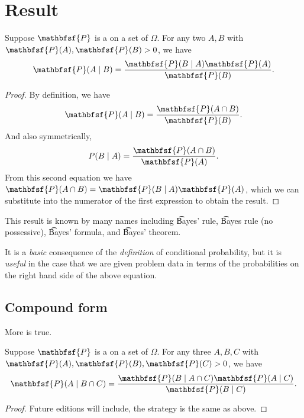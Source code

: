 
\section*{Result}

\begin{proposition}
Suppose $\mathbfsf{P} $ is a on a set of $\Omega $.
For any two $A, B$ with $\mathbfsf{P} (A), \mathbfsf{P} (B) > 0$, we have
\[
\mathbfsf{P} (A \mid  B) = \frac{ \mathbfsf{P} (B \mid A)\mathbfsf{P} (A) }{ \mathbfsf{P} (B) }.
\]
\begin{proof}By definition, we have
\[
\mathbfsf{P} (A \mid  B) = \frac{ \mathbfsf{P} (A \cap  B) }{ \mathbfsf{P} (B) }.
\]
And also symmetrically,
\[
P(B \mid  A) = \frac{ \mathbfsf{P} (A \cap  B) }{ \mathbfsf{P} (A) }.
\]
From this second equation we have $\mathbfsf{P} (A \cap  B) = \mathbfsf{P} (B \mid  A) \mathbfsf{P} (A)$, which we can substitute into the numerator of the first expression to obtain the result.\end{proof}
\end{proposition}

This result is known by many names including \t{Bayes' rule}, \t{Bayes rule} (no possessive), \t{Bayes' formula}, and \t{Bayes' theorem}.

It is a \textit{basic} consequence of the \textit{definition} of conditional probability, but it is \textit{useful} in the case that we are given problem data in terms of the probabilities on the right hand side of the above equation.

\subsection*{Compound form}

More is true.

\begin{proposition}
Suppose $\mathbfsf{P} $ is a on a set of $\Omega $.
For any three $A, B, C$ with $\mathbfsf{P} (A), \mathbfsf{P} (B), \mathbfsf{P} (C) > 0$, we have
\[
\mathbfsf{P} (A \mid  B \cap  C) = \frac{ \mathbfsf{P} (B \mid A \cap  C)\mathbfsf{P} (A \mid  C) }{ \mathbfsf{P} (B \mid  C) }.
\]
\begin{proof}Future editions will include, the strategy is the same as above.\end{proof}
\end{proposition}

\blankpage
